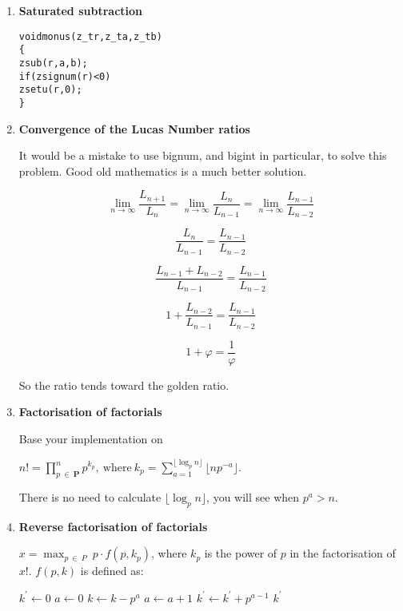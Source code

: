 \begin{enumerate}[label=\textbf{\arabic*}.]

\item \textbf{Saturated subtraction}

\vspace{-1em}
\begin{alltt}
void monus(z_t r, z_t a, z_t b)
\{
    zsub(r, a, b);
    if (zsignum(r) < 0)
        zsetu(r, 0);
\}
\end{alltt}



\item \textbf{Convergence of the Lucas Number ratios}

It would be a mistake to use bignum, and bigint in particular,
to solve this problem. Good old mathematics is a much better solution.

$$ \lim_{n \to \infty} \frac{L_{n + 1}}{L_n} = \lim_{n \to \infty} \frac{L_{n}}{L_{n - 1}} = \lim_{n \to \infty} \frac{L_{n - 1}}{L_{n - 2}} $$

$$ \frac{L_{n}}{L_{n - 1}} = \frac{L_{n - 1}}{L_{n - 2}} $$

$$ \frac{L_{n - 1} + L_{n - 2}}{L_{n - 1}} = \frac{L_{n - 1}}{L_{n - 2}} $$

$$ 1 + \frac{L_{n - 2}}{L_{n - 1}} = \frac{L_{n - 1}}{L_{n - 2}} $$

$$ 1 + \varphi = \frac{1}{\varphi} $$

So the ratio tends toward the golden ratio.



\item \textbf{Factorisation of factorials}

Base your implementation on

\( \displaystyle{
    n! = \prod_{p~\in~\textbf{P}}^{n} p^{k_p}, ~\text{where}~
    k_p = \sum_{a = 1}^{\lfloor \log_p n \rfloor} \lfloor np^{-a} \rfloor.
}\)

There is no need to calculate $\lfloor \log_p n \rfloor$,
you will see when $p^a > n$.



\item \textbf{Reverse factorisation of factorials}

$\displaystyle{x = \max_{p ~\in~ P} ~ p \cdot f(p, k_p)}$,
where $k_p$ is the power of $p$ in the factorisation
of $x!$. $f(p, k)$ is defined as:

\vspace{1em}
\hspace{-2.8ex}
\begin{minipage}{\linewidth}
\begin{algorithmic}
    \STATE $k^\prime \gets 0$
      \STATE $a \gets 0$
        \STATE $k \gets k - p^a$
        \STATE $a \gets a + 1$
      \ENDWHILE
      \STATE $k^\prime \gets k^\prime + p^{a - 1}$
    \ENDWHILE
    \RETURN $k^\prime$
\end{algorithmic}
\end{minipage}
\vspace{1em}




\end{enumerate}
